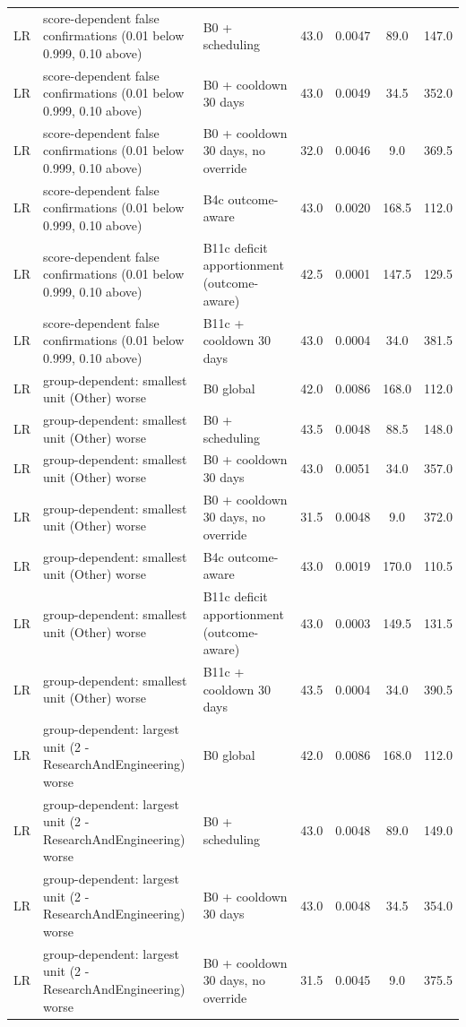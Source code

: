 \begin{longtable}{lp{5.2cm}p{4.4cm}cccc}
LR & score-dependent false confirmations (0.01 below 0.999, 0.10 above) & B0 + scheduling & 43.0 & 0.0047 & 89.0 & 147.0 \\
LR & score-dependent false confirmations (0.01 below 0.999, 0.10 above) & B0 + cooldown 30 days & 43.0 & 0.0049 & 34.5 & 352.0 \\
LR & score-dependent false confirmations (0.01 below 0.999, 0.10 above) & B0 + cooldown 30 days, no override & 32.0 & 0.0046 & 9.0 & 369.5 \\
LR & score-dependent false confirmations (0.01 below 0.999, 0.10 above) & B4c outcome-aware & 43.0 & 0.0020 & 168.5 & 112.0 \\
LR & score-dependent false confirmations (0.01 below 0.999, 0.10 above) & B11c deficit apportionment (outcome-aware) & 42.5 & 0.0001 & 147.5 & 129.5 \\
LR & score-dependent false confirmations (0.01 below 0.999, 0.10 above) & B11c + cooldown 30 days & 43.0 & 0.0004 & 34.0 & 381.5 \\
LR & group-dependent: smallest unit (Other) worse & B0 global & 42.0 & 0.0086 & 168.0 & 112.0 \\
LR & group-dependent: smallest unit (Other) worse & B0 + scheduling & 43.5 & 0.0048 & 88.5 & 148.0 \\
LR & group-dependent: smallest unit (Other) worse & B0 + cooldown 30 days & 43.0 & 0.0051 & 34.0 & 357.0 \\
LR & group-dependent: smallest unit (Other) worse & B0 + cooldown 30 days, no override & 31.5 & 0.0048 & 9.0 & 372.0 \\
LR & group-dependent: smallest unit (Other) worse & B4c outcome-aware & 43.0 & 0.0019 & 170.0 & 110.5 \\
LR & group-dependent: smallest unit (Other) worse & B11c deficit apportionment (outcome-aware) & 43.0 & 0.0003 & 149.5 & 131.5 \\
LR & group-dependent: smallest unit (Other) worse & B11c + cooldown 30 days & 43.5 & 0.0004 & 34.0 & 390.5 \\
LR & group-dependent: largest unit (2 - ResearchAndEngineering) worse & B0 global & 42.0 & 0.0086 & 168.0 & 112.0 \\
LR & group-dependent: largest unit (2 - ResearchAndEngineering) worse & B0 + scheduling & 43.0 & 0.0048 & 89.0 & 149.0 \\
LR & group-dependent: largest unit (2 - ResearchAndEngineering) worse & B0 + cooldown 30 days & 43.0 & 0.0048 & 34.5 & 354.0 \\
LR & group-dependent: largest unit (2 - ResearchAndEngineering) worse & B0 + cooldown 30 days, no override & 31.5 & 0.0045 & 9.0 & 375.5 \\

\end{longtable}
